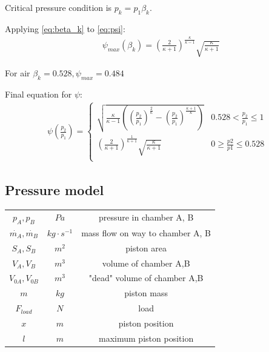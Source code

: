 \documentclass[class=article, crop=false]{standalone}
\begin{document}
Critical pressure condition is $p_k = p_1 \beta_k$.

Applying \ref{eq:beta_k} to \ref{eq:psi}:
\begin{align}
    &\psi_{max} (\beta_k) = 
    \left(\frac{2}{\kappa+1}\right)^\frac{\kappa}{\kappa-1}\sqrt{\frac{\kappa}{\kappa+1}}
\end{align}

For air $\beta_k = 0.528, \psi_{max} = 0.484$


Final equation for $\psi$:
\begin{align}
    \psi\left(\frac{p_2}{p_1}\right) = 
    \begin{cases}
    \sqrt{\frac{\kappa}{\kappa-1}\left(\left(\frac{p_2}{p_1}\right)^\frac{2}{\kappa} -
    \left(\frac{p_2}{p_1}\right)^\frac{\kappa + 1}{\kappa}\right)} & 0.528
    <\frac{p_2}{p_1} \le 1 \\
    \left(\frac{2}{\kappa +1}\right)^{\frac{1}{\kappa+1}}
    \sqrt{\frac{\kappa}{\kappa +1}} & 0 \ge \frac{p2}{p1} \le 0.528\\
    \end{cases}
\end{align}


\subsection{Pressure model}

\begin{tabular}{ |c|c|c| }
    \hline
    $p_A, p_B$              & $Pa$              & pressure in chamber A, B \\
    $\dot{m_A}, \dot{m_B}$  & $kg \cdot s^{-1}$ & mass flow on way to chamber A, B \\
    $S_A, S_B$              & $m^2$             & piston area  \\
    $V_A, V_B$              & $m^3$             & volume of chamber A,B \\
    $V_{0A}, V_{0B}$        & $m^3$             & "dead" volume of chamber A,B \\
    $m$                     & $kg$              & piston mass\\
    $F_{load}$              & $N$               & load \\
    $x$                     & $m$               & piston position \\
    $l$                     & $m$               & maximum piston position \\
    \hline
\end{tabular}
\end{document}
